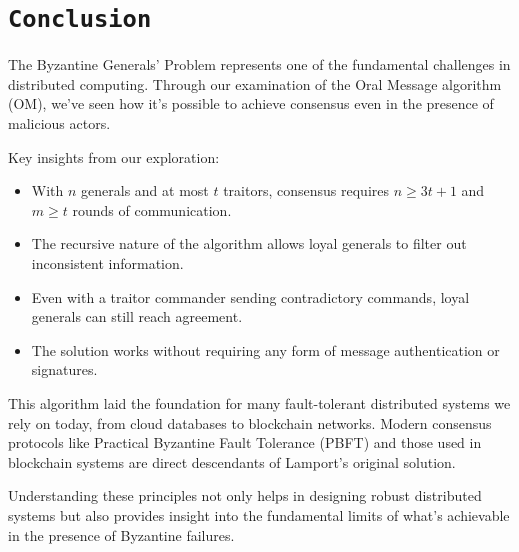\documentclass[11pt]{article}
\begin{document}
\section*{\texttt{\Large Conclusion}}

\justifying
The Byzantine Generals' Problem represents one of the fundamental challenges in distributed computing. Through our examination of the Oral Message algorithm (OM), we've seen how it's possible to achieve consensus even in the presence of malicious actors.

Key insights from our exploration:

\begin{itemize}
    \item With $n$ generals and at most $t$ traitors, consensus requires $n \geq 3t+1$ and $m \geq t$ rounds of communication.
    \item The recursive nature of the algorithm allows loyal generals to filter out inconsistent information.
    \item Even with a traitor commander sending contradictory commands, loyal generals can still reach agreement.
    \item The solution works without requiring any form of message authentication or signatures.
\end{itemize}

This algorithm laid the foundation for many fault-tolerant distributed systems we rely on today, from cloud databases to blockchain networks. Modern consensus protocols like Practical Byzantine Fault Tolerance (PBFT) and those used in blockchain systems are direct descendants of Lamport's original solution.

Understanding these principles not only helps in designing robust distributed systems but also provides insight into the fundamental limits of what's achievable in the presence of Byzantine failures.
\end{document}
